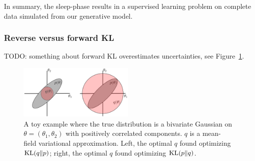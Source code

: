 In summary, the sleep-phase results in a supervised learning problem on complete data simulated from our generative model. 

\subsubsection{Reverse versus forward KL}
\label{sec:kl_q_p}
TODO: something about forward KL overestimates uncertainties, see Figure~\ref{fig:kl_q_p_schematic}. 

\begin{figure}[!h]
    \centering
    \includegraphics[width = 0.5\textwidth]{figures/kl_q_p_schematic.png}
    \caption{A toy example where the true distribution is a bivariate Gaussian on 
    $\theta = (\theta_1, \theta_2)$ with positively correlated components. 
    $q$ is a mean-field variational approximation. Left, the optimal $q$ found 
    optimizing $\textrm{KL}(q\|p)$; right, the optimal $q$ found optimizing $\textrm{KL}(p\|q)$. }
    \label{fig:kl_q_p_schematic}
\end{figure}

